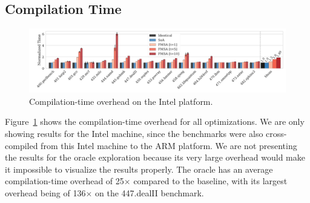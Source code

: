 



\subsection{Compilation Time}

\begin{figure}[th]
  \centering
  \includegraphics[width=\linewidth]{figs/compilation-time.pdf}
  \caption{Compilation-time overhead on the Intel platform.}
  \label{fig:compilation-time}
\end{figure}

Figure~\ref{fig:compilation-time} shows the compilation-time overhead for all
optimizations.
We are only showing results for the Intel machine, since the benchmarks were
also cross-compiled from this Intel machine to the ARM platform.
We are not presenting the results for the oracle exploration because its very
large overhead would make it impossible to visualize the results properly.
The oracle has an average compilation-time overhead of 25$\times$ compared to
the baseline, with its largest overhead being of 136$\times$ on the 447.dealII
benchmark.

